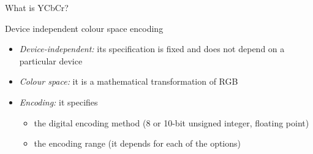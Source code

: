 \documentclass[aspectratio=169,handout,usepdftitle=false]{fireshonks}
\begin{document}
\begin{frame}{What is YCbCr?}
    \begin{center}
        Device independent colour space encoding
    \end{center}

    \begin{itemize}[<+(1)->]
        \item \emph{Device-independent:} its specification is fixed and does not depend on a particular device
        \item \emph{Colour space:} it is a mathematical transformation of RGB
        \item \emph{Encoding:} it specifies
              \begin{itemize}
                  \item the digital encoding method (8 or 10-bit unsigned integer, floating point)
                  \item the encoding range (it depends for each of the options)
              \end{itemize}
    \end{itemize}
\end{frame}
\end{document}
